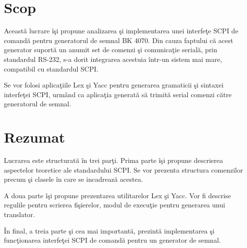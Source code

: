 \section{Scop}

Aceast\u{a} lucrare \^{i}\c{s}i propune analizarea \c{s}i implementarea unei interfe\c{t}e SCPI de comand\u{a} pentru generatorul de semnal BK 4070. Din cauza faptului c\u{a} acest generator suport\u{a} un anumit set de comenzi \c{s}i comunica\c{t}ie serial\u{a}, prin standardul RS-232, s-a dorit integrarea acestuia \^{i}ntr-un sistem mai mare, compatibil cu standardul SCPI.

Se vor folosi aplica\c{t}iile Lex \c{s}i Yacc pentru generarea gramaticii \c{s}i sintaxei interfe\c{t}ei SCPI, urm\^{a}nd ca aplica\c{t}ia generat\u{a} s\u{a} trimit\u{a} serial comenzi c\u{a}tre generatorul de semnal.

\section{Rezumat}

Lucrarea este structurat\u{a} \^{i}n trei par\c{t}i. Prima parte \^{i}\c{s}i propune descrierea aspectelor teoretice ale standardului SCPI. Se vor prezenta structura comenzilor precum \c{s}i clasele \^{i}n care se incadreaz\u{a} acestea.

A doua parte \^{i}\c{s}i propune prezentarea utilitarelor Lex \c{s}i Yacc. Vor fi descrise regulile pentru scrierea fi\c{s}ierelor, modul de execu\c{t}ie pentru generarea unui translator.

\^{I}n final, a treia parte \c{s}i cea mai important\u{a}, prezint\u{a} implementarea \c{s}i func\c{t}ionarea interfe\c{t}ei SCPI de comand\u{a} pentru un generator de semnal.
